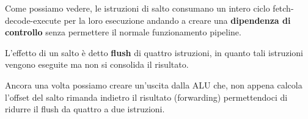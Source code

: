 Come possiamo vedere, le istruzioni di salto consumano un intero ciclo fetch-decode-execute per la
loro esecuzione andando a creare una \textbf{dipendenza di controllo} senza permettere il normale
funzionamento pipeline.

L'effetto di un salto è detto \textbf{flush} di quattro istruzioni, in quanto tali istruzioni
vengono eseguite ma non si consolida il risultato.

Ancora una volta possiamo creare un'uscita dalla ALU che, non appena calcola l'offset del salto
rimanda indietro il risultato (forwarding) permettendoci di ridurre il flush da quattro a due
istruzioni.
